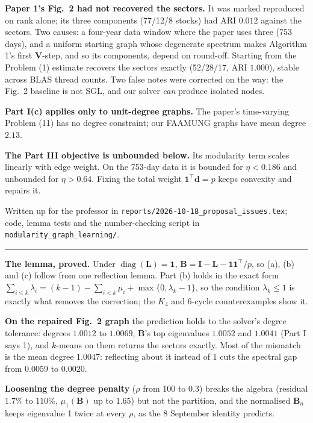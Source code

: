 \documentclass[11pt,a4paper]{article}
\newcommand{\logday}[1]{\par\vspace{3mm}\noindent{\large\textbf{#1}}\par\vspace{1mm}\hrule\vspace{2mm}\noindent}
\begin{document}
\textbf{Paper 1's Fig.~2 had not recovered the sectors.} It was marked reproduced on
rank alone; its three components (77/12/8 stocks) had ARI $0.012$ against the sectors.
Two causes: a four-year data window where the paper uses three (753 days), and a
uniform starting graph whose degenerate spectrum makes Algorithm 1's first
$\mathbf{V}$-step, and so its components, depend on round-off. Starting from the
Problem (1) estimate recovers the sectors exactly (52/28/17, ARI $1.000$), stable
across BLAS thread counts. Two false notes were corrected on the way: the Fig.~2
baseline is not SGL, and our solver \emph{can} produce isolated nodes.

\textbf{Part I(c) applies only to unit-degree graphs.} The paper's time-varying
Problem (11) has no degree constraint; our FAAMUNG graphs have mean degree $2.13$.

\textbf{The Part III objective is unbounded below.} Its modularity term scales
linearly with edge weight. On the 753-day data it is bounded for $\eta<0.186$ and
unbounded for $\eta>0.64$. Fixing the total weight $\mathbf{1}^\top\mathbf{d}=p$ keeps
convexity and repairs it.

Written up for the professor in \texttt{reports/2026-10-18\_proposal\_issues.tex};
code, lemma tests and the number-checking script in
\texttt{modularity\_graph\_learning/}.

\logday{27 October: Part I finished}

\textbf{The lemma, proved.} Under $\operatorname{diag}(\mathbf{L})=\mathbf{1}$,
$\mathbf{B}=\mathbf{I}-\mathbf{L}-\mathbf{1}\mathbf{1}^\top/p$, so (a), (b) and (c) follow
from one reflection lemma. Part (b) holds in the exact form
$\sum_{i\le k}\lambda_i=(k-1)-\sum_{i<k}\mu_i+\max\{0,\lambda_k-1\}$, so the
condition $\lambda_k\le1$ is exactly what removes the correction; the $K_4$ and 6-cycle
counterexamples show it.

\textbf{On the repaired Fig.~2 graph} the prediction holds to the solver's degree
tolerance: degrees $1.0012$ to $1.0069$, $\mathbf{B}$'s top eigenvalues $1.0052$ and
$1.0041$ (Part I says 1), and $k$-means on them returns the sectors exactly. Most of
the mismatch is the mean degree $1.0047$: reflecting about it instead of 1 cuts the
spectral gap from $0.0059$ to $0.0020$.

\textbf{Loosening the degree penalty} ($\rho$ from 100 to 0.3) breaks the algebra
(residual $1.7\%$ to $110\%$, $\mu_1(\mathbf{B})$ up to $1.65$) but not the partition,
and the normalised $\mathbf{B}_n$ keeps eigenvalue 1 twice at every $\rho$, as the
8 September identity predicts.
\end{document}
